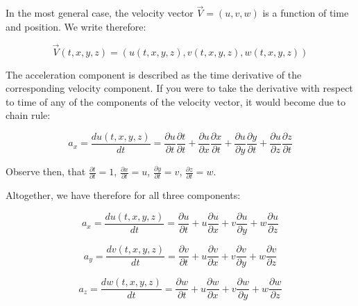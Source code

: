 In the most general case, the velocity vector $\vec{V} = (u, v, w)$ is a function of time and position. We write therefore:


\begin{equation}
\vec{V}(t, x, y, z) = (u(t, x, y, z), v(t, x, y, z), w(t, x, y, z))
\end{equation}

The acceleration component is described as the time derivative of the corresponding velocity component. If you were to take the derivative with respect to time of any of the components of the velocity vector, it would become due to chain rule:

\begin{equation}
a_x = \frac{d u(t,x,y,z)}{dt} = \frac{\partial u}{\partial t} \frac{\partial t}{\partial t} + \frac{\partial u}{\partial x} \frac{\partial x}{\partial t} + \frac{\partial u}{\partial y} \frac{\partial y}{\partial t} + \frac{\partial u}{\partial z} \frac{\partial z}{\partial t}
\end{equation}

Observe then, that $\frac{\partial t}{\partial t} = 1$, $\frac{\partial x}{\partial t} = u$, $\frac{\partial y}{\partial t} = v$, $\frac{\partial z}{\partial t} = w$.

Altogether, we have therefore for all three components:

\begin{equation}
a_x = \frac{d u(t,x,y,z)}{dt} = \frac{\partial u}{\partial t} + u \frac{\partial u}{\partial x} + v \frac{\partial u}{\partial y} + w \frac{\partial u}{\partial z}
\end{equation}

\begin{equation}
a_y = \frac{d v(t,x,y,z)}{dt} = \frac{\partial v}{\partial t} + u \frac{\partial v}{\partial x} + v \frac{\partial v}{\partial y} + w \frac{\partial v}{\partial z}
\end{equation}

\begin{equation}
a_z = \frac{d w(t,x,y,z)}{dt} = \frac{\partial w}{\partial t} + u \frac{\partial w}{\partial x} + v \frac{\partial w}{\partial y} + w \frac{\partial w}{\partial z}
\end{equation}


